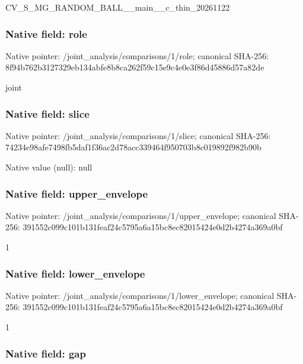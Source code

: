 \documentclass[10pt,a4paper]{article}
\begin{document}
CV\_S\_MG\_RANDOM\_BALL\_\_mai\allowbreak{}n\_\_c\_thin\_20261122


\subsubsection{Native field: role}


Native pointer: /joint\_analysis/comparisons/1/role; canonical SHA-256: 8f94b762b3127329eb134abf\allowbreak{}e8b8ca262f59c15e9c4e0e3f\allowbreak{}86d45886d57a82de


joint


\subsubsection{Native field: slice}


Native pointer: /joint\_analysis/comparisons/1/slice; canonical SHA-256: 74234e98afe7498fb5daf1f3\allowbreak{}6ac2d78acc339464f950703b\allowbreak{}8c019892f982b90b



Native value (null): null



\subsubsection{Native field: upper\_envelope}


Native pointer: /joint\_analysis/comparis\allowbreak{}ons/1/upper\_envelope; canonical SHA-256: 391552c099c101b131feaf24\allowbreak{}c5795a6a15bc8ec82015424e\allowbreak{}0d2b4274a369a0bf


1


\subsubsection{Native field: lower\_envelope}


Native pointer: /joint\_analysis/comparis\allowbreak{}ons/1/lower\_envelope; canonical SHA-256: 391552c099c101b131feaf24\allowbreak{}c5795a6a15bc8ec82015424e\allowbreak{}0d2b4274a369a0bf


1


\subsubsection{Native field: gap}
\end{document}
